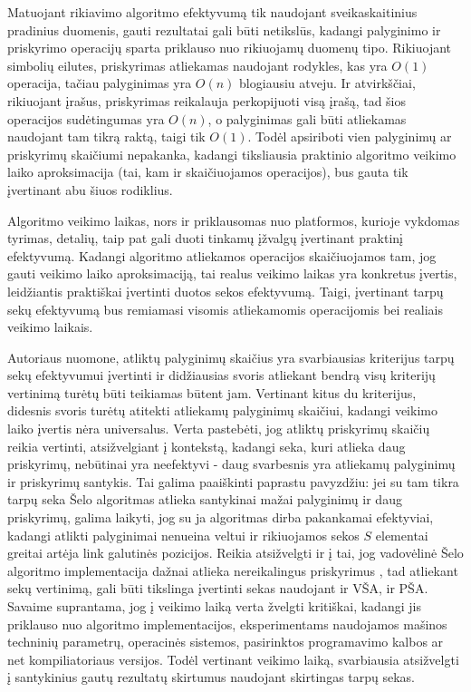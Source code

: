 \documentclass{VUMIFInfKursinis}
\begin{document}
Matuojant rikiavimo algoritmo efektyvumą tik naudojant sveikaskaitinius pradinius duomenis, gauti rezultatai gali būti netikslūs,
kadangi palyginimo ir priskyrimo operacijų sparta priklauso nuo rikiuojamų duomenų tipo.
Rikiuojant simbolių eilutes, priskyrimas atliekamas naudojant rodykles, kas yra $O(1)$ operacija,
tačiau palyginimas yra $O(n)$ blogiausiu atveju.
Ir atvirkščiai, rikiuojant įrašus, priskyrimas reikalauja perkopijuoti visą įrašą, tad šios operacijos sudėtingumas yra $O(n)$,
o palyginimas gali būti atliekamas naudojant tam tikrą raktą, taigi tik $O(1)$.
Todėl apsiriboti vien palyginimų ar priskyrimų skaičiumi nepakanka, kadangi tiksliausia praktinio algoritmo
veikimo laiko aproksimacija (tai, kam ir skaičiuojamos operacijos), bus gauta tik įvertinant abu šiuos rodiklius.

Algoritmo veikimo laikas, nors ir priklausomas nuo platformos, kurioje vykdomas tyrimas, detalių,
taip pat gali duoti tinkamų įžvalgų įvertinant praktinį efektyvumą.
Kadangi algoritmo atliekamos operacijos skaičiuojamos tam, jog gauti
veikimo laiko aproksimaciją, tai realus veikimo laikas
yra konkretus įvertis, leidžiantis praktiškai įvertinti duotos sekos efektyvumą.
Taigi, įvertinant tarpų sekų efektyvumą bus remiamasi visomis atliekamomis operacijomis bei realiais veikimo laikais.

Autoriaus nuomone, atliktų palyginimų skaičius yra svarbiausias kriterijus tarpų sekų efektyvumui įvertinti ir
didžiausias svoris atliekant bendrą visų kriterijų vertinimą turėtų būti teikiamas būtent jam.
Vertinant kitus du kriterijus, didesnis svoris turėtų atitekti atliekamų palyginimų skaičiui,
kadangi veikimo laiko įvertis nėra universalus.
Verta pastebėti, jog atliktų priskyrimų skaičių reikia vertinti, atsižvelgiant į kontekstą, kadangi
seka, kuri atlieka daug priskyrimų, nebūtinai yra neefektyvi - daug svarbesnis yra atliekamų palyginimų ir priskyrimų santykis.
Tai galima paaiškinti paprastu pavyzdžiu: jei su tam tikra tarpų seka Šelo algoritmas atlieka santykinai mažai palyginimų ir daug priskyrimų, galima laikyti,
jog su ja algoritmas dirba pakankamai efektyviai, kadangi atlikti palyginimai nenueina veltui ir rikiuojamos sekos $S$ elementai greitai artėja link galutinės pozicijos.
Reikia atsižvelgti ir į tai, jog vadovėlinė Šelo algoritmo implementacija dažnai atlieka nereikalingus priskyrimus \cite{Radavičius_Baranauskas_2013},
tad atliekant sekų vertinimą, gali būti tikslinga įvertinti sekas naudojant ir VŠA, ir PŠA.
Savaime suprantama, jog į veikimo laiką verta žvelgti kritiškai, kadangi jis priklauso nuo algoritmo implementacijos,
eksperimentams naudojamos mašinos techninių parametrų, operacinės sistemos, pasirinktos programavimo kalbos ar net kompiliatoriaus versijos.
Todėl vertinant veikimo laiką, svarbiausia atsižvelgti į santykinius gautų rezultatų skirtumus naudojant skirtingas tarpų sekas.
\end{document}
